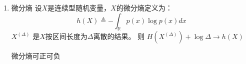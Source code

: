 \documentclass{article}
\def\E{\mathbb{E}}
\begin{document}
\begin{enumerate}
互信息$I(X;Y)$可以看成是$p(x),p(y|x)$的泛函数：
$$
I(X;Y)=\sum_{\substack{x\in \mathcal{X}\\ y\in \mathcal{Y}}} p(x)p(y|x) \log \frac{p(y|x)}{\sum_{x\in \mathcal{X}} p(x)p(y|x)}
$$
关于互信息的凸性可以总结为以下两点：
\begin{itemize}
\item $I(X;Y)$关于$p(x)$上凸
\item $I(X;Y)$关于$p(y|x)$下凸。
\end{itemize}
数据处理不等式：设 $ P_Y = P_{Y|X}\circ P_X, Q_Y = P_{Y|X} \circ Q_X $
则 $D(P_X || Q_X) \geq D(P_Y || Q_Y) $。
\begin{proof}
$\E_{XY}[\log \frac{P_{XY}}{Q_{XY}}] = 
\E_{XY}[\log \frac{P_{Y|X}}{Q_{Y|X}} + \log \frac{P_X}{Q_X}]$
因为 $Q_{Y|X} = P_{Y|X} \Rightarrow \E_{XY}[\log \frac{P_{XY}}{Q_{XY}}]  = D(P_X || Q_X)$
又
\begin{align*}
\E_{XY}[\log \frac{P_{XY}}{Q_{XY}}] = &
\E_{XY}[\log \frac{P_{X|Y}}{Q_{X|Y}} + \log \frac{P_Y}{Q_Y}] \\
& = \E_{Y}[D(P_{X|Y} || Q_{X|Y})] + D(P_Y || Q_Y) \\
& \geq D(P_Y || Q_Y)
\end{align*}
所以有$D(P_X || Q_X) \geq D(P_Y || Q_Y) $。
\end{proof}
\item 微分熵
设$X$是连续型随机变量，$X$的微分熵定义为：
\begin{equation}\label{eq:differential_entropy}
h(X)\triangleq -\int_{\mathbb{R}} p(x)\log p(x)dx
\end{equation}
$X^{(\Delta)}$ 是$X$按区间长度为$\Delta$离散的结果。
则 $H(X^{(\Delta)})+\log \Delta \to h(X)$


微分熵可正可负


\end{enumerate}
\end{document}
